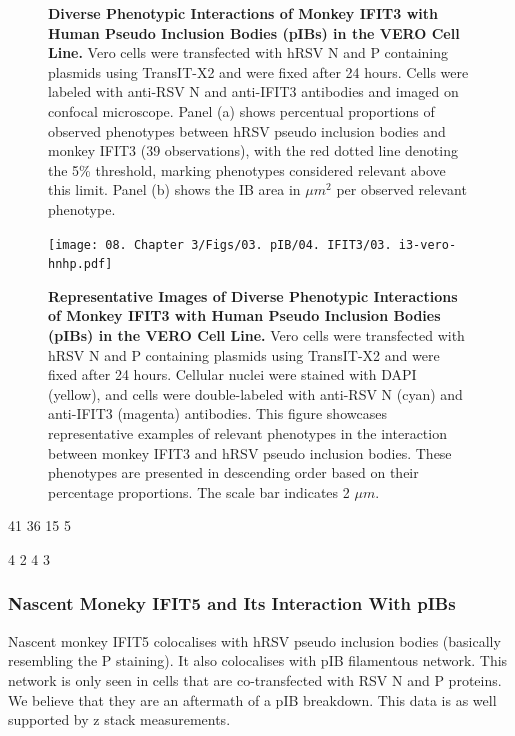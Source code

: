 \begin{figure}
\begin{subfigure}{0.495\textwidth}
    \end{subfigure}
    \caption[Diverse Phenotypic Interactions of Monkey IFIT3 with Human Pseudo Inclusion Bodies (pIBs) in the VERO Cell Line.]{\textbf{Diverse Phenotypic Interactions of Monkey IFIT3 with Human Pseudo Inclusion Bodies (pIBs) in the VERO Cell Line.} Vero cells were transfected with hRSV N and P containing plasmids using TransIT-X2 and were fixed after 24 hours. Cells were labeled with anti-RSV N and anti-IFIT3 antibodies and imaged on confocal microscope. Panel (a) shows percentual proportions of observed phenotypes between hRSV pseudo inclusion bodies and monkey IFIT3 (39 observations), with the red dotted line denoting the 5\% threshold, marking phenotypes considered relevant above this limit. Panel (b) shows the IB area in \(\mu m^2\) per observed relevant phenotype.}
    \label{fig:Diverse Phenotypic Interactions of Monkey IFIT3 with Human Pseudo Inclusion Bodies (pIBs) in the VERO Cell Line}
\end{figure}

\begin{figure}
    \centering
    \texttt{[image: 08. Chapter 3/Figs/03. pIB/04. IFIT3/03. i3-vero-hnhp.pdf]}
    \caption[Representative Images of Diverse Phenotypic Interactions of Monkey IFIT3 with Human Pseudo Inclusion Bodies (pIBs) in the VERO Cell Line.]{\textbf{Representative Images of Diverse Phenotypic Interactions of Monkey IFIT3 with Human Pseudo Inclusion Bodies (pIBs) in the VERO Cell Line.} Vero cells were transfected with hRSV N and P containing plasmids using TransIT-X2 and were fixed after 24 hours. Cellular nuclei were stained with DAPI (yellow), and cells were double-labeled with anti-RSV N (cyan) and anti-IFIT3 (magenta) antibodies. This figure showcases representative examples of relevant phenotypes in the interaction between monkey IFIT3 and hRSV pseudo inclusion bodies. These phenotypes are presented in descending order based on their percentage proportions. The scale bar indicates 2 \(\mu m\).}
    \label{fig:Representative Images of Diverse Phenotypic Interactions of Monkey IFIT3 with Human Pseudo Inclusion Bodies (pIBs) in the VERO Cell Line}
\end{figure}

41 36 15 5

4 2 4 3

\subsubsection{Nascent Moneky IFIT5 and Its Interaction With pIBs}
Nascent monkey IFIT5 colocalises with hRSV pseudo inclusion bodies (basically resembling the P staining). It also colocalises with pIB filamentous network. This network is only seen in cells that are co-transfected with RSV N and P proteins. We believe that they are an aftermath of a pIB breakdown. This data is as well supported by z stack measurements.

